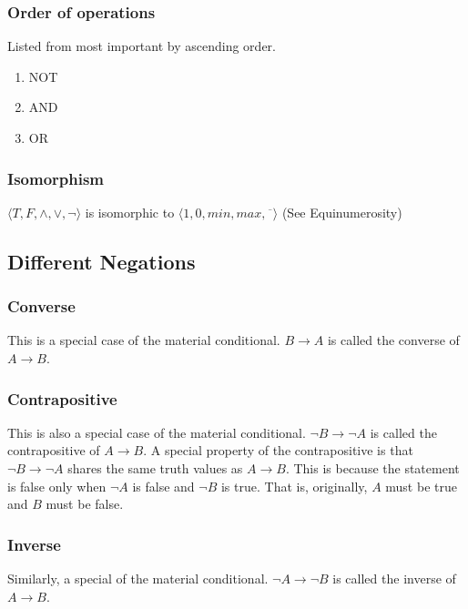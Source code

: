 \documentclass[a4paper]{article}
\theoremstyle{plain}
\theoremstyle{definition}
\theoremstyle{remark}
\begin{document}
\subsubsection{Order of operations}
Listed from most important by ascending order.
\begin{enumerate}
	\item NOT
	\item AND
	\item OR
\end{enumerate}
\subsubsection{Isomorphism}
$\langle T,F,\land,\lor,\neg \rangle$ is isomorphic to $\langle 1,0,min,max,\overline{\phantom{r}} \rangle$ (See Equinumerosity)
\subsection{Different Negations}
\subsubsection{Converse}
This is a special case of the material conditional. $B \to  A$ is called the converse of $A \to  B$.
\subsubsection{Contrapositive}
This is also a special case of the material conditional. $\neg B  \to  \neg A$ is called the contrapositive of $A \to B$. A special property of the contrapositive is that $\neg B \to  \neg A$ shares the same truth values as $A \to B$. This is because the statement is false only when $\neg A$ is false and $\neg B$ is true. That is, originally, $A$ must be true and $B$ must be false.
\subsubsection{Inverse}
Similarly, a special of the material conditional. $\neg A \to \neg B$ is called the inverse of $A \to  B$.
\end{document}
